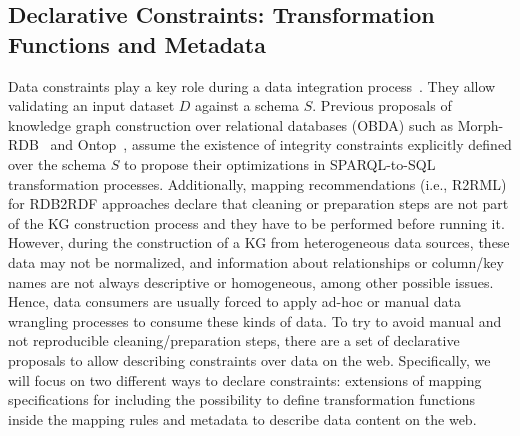 \subsection{Declarative Constraints: Transformation Functions and Metadata}
Data constraints play a key role during a data integration process~\citep{cali2002data}. They allow validating an input dataset $D$ against a schema $S$. Previous proposals of knowledge graph construction over relational databases (OBDA) such as Morph-RDB~\citep{priyatna2014formalisation} and Ontop~\citep{calvanese2017ontop}, assume the existence of integrity constraints explicitly defined over the schema $S$ to propose their optimizations in SPARQL-to-SQL transformation processes. Additionally, mapping recommendations (i.e., R2RML) for RDB2RDF approaches declare that cleaning or preparation steps are not part of the KG construction process and they have to be performed before running it. However, during the construction of a KG from heterogeneous data sources, these data may not be normalized, and information about relationships or column/key names are not always descriptive or homogeneous, among other possible issues. Hence, data consumers are usually forced to apply ad-hoc or manual data wrangling processes to consume these kinds of data. To try to avoid manual and not reproducible cleaning/preparation steps, there are a set of declarative proposals to allow describing constraints over data on the web. Specifically, we will focus on two different ways to declare constraints: extensions of mapping specifications for including the possibility to define transformation functions inside the mapping rules and metadata to describe data content on the web. 

